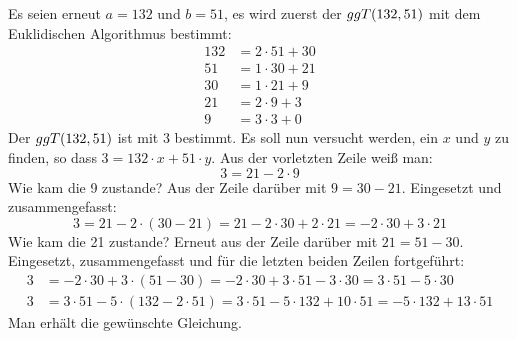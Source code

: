 \begin{example}
  Es seien erneut $a=132$ und $b=51$, es wird zuerst der $ggT(132,51)$ mit dem
  Euklidischen Algorithmus bestimmt:
  \begin{align*}
    132 & = 2 \cdot 51 + 30 \\
    51  & = 1 \cdot 30 + 21 \\
    30  & = 1 \cdot 21 + 9  \\
    21  & = 2 \cdot 9 + 3   \\
    9   & = 3 \cdot 3 + 0
  \end{align*}
  Der $ggT(132,51)$ ist mit 3 bestimmt. Es soll nun versucht werden, ein $x$ und $y$
  zu finden, so dass $3 = 132 \cdot x + 51 \cdot y$. Aus der vorletzten Zeile weiß man:
  \begin{equation*}
    3 = 21 - 2 \cdot 9
  \end{equation*}
  Wie kam die 9 zustande? Aus der Zeile darüber mit $9 = 30 - 21$.
  Eingesetzt und zusammengefasst:
  \begin{equation*}
    3 = 21 - 2 \cdot (30 - 21) = 21 - 2 \cdot 30 + 2 \cdot 21 = -2 \cdot 30 + 3 \cdot 21
  \end{equation*}
  Wie kam die 21 zustande? Erneut aus der Zeile darüber mit $21 = 51 - 30$.
  Eingesetzt, zusammengefasst und für die letzten beiden Zeilen fortgeführt:
  \begin{align*}
    3 & = -2 \cdot 30 + 3 \cdot (51 - 30) =
    -2 \cdot 30 + 3 \cdot 51 - 3 \cdot 30 = 3 \cdot 51 - 5 \cdot 30                          \\
    3 & = 3 \cdot 51 - 5 \cdot (132 - 2 \cdot 51) = 3 \cdot 51 - 5 \cdot 132 + 10 \cdot 51 =
    -5 \cdot 132 + 13 \cdot 51
  \end{align*}
  Man erhält die gewünschte Gleichung.
\end{example}

